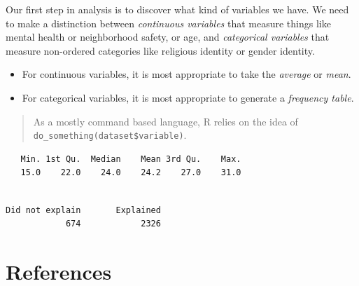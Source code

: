\documentclass[
  letterpaper,
  DIV=11,
  numbers=noendperiod]{scrreprt}
\newenvironment{Shaded}{\begin{snugshade}}{\end{snugshade}}
\newcommand{\CommentTok}[1]{\textcolor[rgb]{0.37,0.37,0.37}{#1}}
\newcommand{\FunctionTok}[1]{\textcolor[rgb]{0.28,0.35,0.67}{#1}}
\newcommand{\NormalTok}[1]{\textcolor[rgb]{0.00,0.23,0.31}{#1}}
\newcommand{\SpecialCharTok}[1]{\textcolor[rgb]{0.37,0.37,0.37}{#1}}
\providecommand{\tightlist}{%
  \setlength{\itemsep}{0pt}\setlength{\parskip}{0pt}}\usepackage{longtable,booktabs,array}
\begin{document}
Our first step in analysis is to discover what kind of variables we
have. We need to make a distinction between \emph{continuous variables}
that measure things like mental health or neighborhood safety, or age,
and \emph{categorical variables} that measure non-ordered categories
like religious identity or gender identity.

\begin{itemize}
\tightlist
\item
  For continuous variables, it is most appropriate to take the
  \emph{average} or \emph{mean}.
\item
  For categorical variables, it is most appropriate to generate a
  \emph{frequency table}.
\end{itemize}

\begin{quote}
As a mostly command based language, R relies on the idea of
\texttt{do\_something(dataset\$variable)}.
\end{quote}

\begin{Shaded}
\end{Shaded}

\begin{verbatim}
   Min. 1st Qu.  Median    Mean 3rd Qu.    Max. 
   15.0    22.0    24.0    24.2    27.0    31.0 
\end{verbatim}

\begin{Shaded}
\end{Shaded}

\begin{verbatim}

Did not explain       Explained 
            674            2326 
\end{verbatim}


\hypertarget{references}{%
\chapter*{References}\label{references}}
\end{document}
